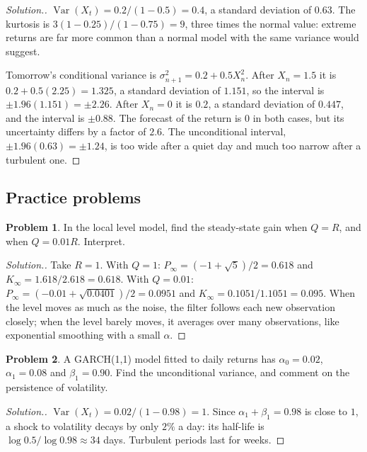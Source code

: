 \documentclass[11pt,a4paper]{article}
\theoremstyle{definition}
\newtheorem{problemx}{Problem}[subsection]
\newenvironment{problem}{\begin{problemx}}{\end{problemx}}
\newenvironment{solution}
  {\renewcommand{\qedsymbol}{}\begin{proof}[\textit{Solution}.]}
  {\end{proof}}
\DeclareMathOperator{\Var}{Var}
\begin{document}
\begin{solution}
$\Var(X_t) = 0.2/(1 - 0.5) = 0.4$, a standard deviation of $0.63$. The kurtosis is $3(1 - 0.25)/(1 - 0.75) = 9$, three times the normal value: extreme returns are
far more common than a normal model with the same variance would suggest.

Tomorrow's conditional variance is $\sigma_{n+1}^2 = 0.2 + 0.5X_n^2$. After $X_n = 1.5$ it is $0.2 + 0.5(2.25) = 1.325$, a standard deviation of $1.151$, so the interval is
$\pm1.96(1.151) = \pm2.26$. After $X_n = 0$ it is $0.2$, a standard deviation of $0.447$, and the interval is $\pm0.88$. The forecast of the return is $0$ in both
cases, but its uncertainty differs by a factor of $2.6$. The unconditional interval, $\pm1.96(0.63) = \pm1.24$, is too wide after a quiet day and much
too narrow after a turbulent one.
\end{solution}

\subsection{Practice problems}
\begin{problem}\label{prob:kalman-gain}
In the local level model, find the steady-state gain when $Q = R$, and when $Q = 0.01R$. Interpret.
\end{problem}

\begin{solution}
Take $R = 1$. With $Q = 1$: $P_\infty = (-1 + \sqrt5)/2 = 0.618$ and $K_\infty = 1.618/2.618 = 0.618$. With $Q = 0.01$: $P_\infty = (-0.01 + \sqrt{0.0401})/2 = 0.0951$ and
$K_\infty = 0.1051/1.1051 = 0.095$. When the level moves as much as the noise, the filter follows each new observation closely;
when the level barely moves, it averages over many observations, like exponential smoothing with a small $\alpha$.
\end{solution}

\begin{problem}\label{prob:garch-var}
A GARCH(1,1) model fitted to daily returns has $\alpha_0 = 0.02$, $\alpha_1 = 0.08$ and $\beta_1 = 0.90$. Find the unconditional variance, and comment on
the persistence of volatility.
\end{problem}

\begin{solution}
$\Var(X_t) = 0.02/(1 - 0.98) = 1$. Since $\alpha_1 + \beta_1 = 0.98$ is close to $1$, a shock to volatility decays by only $2\%$ a day: its half-life is
$\log0.5/\log0.98 \approx 34$ days. Turbulent periods last for weeks.
\end{solution}
\end{document}
